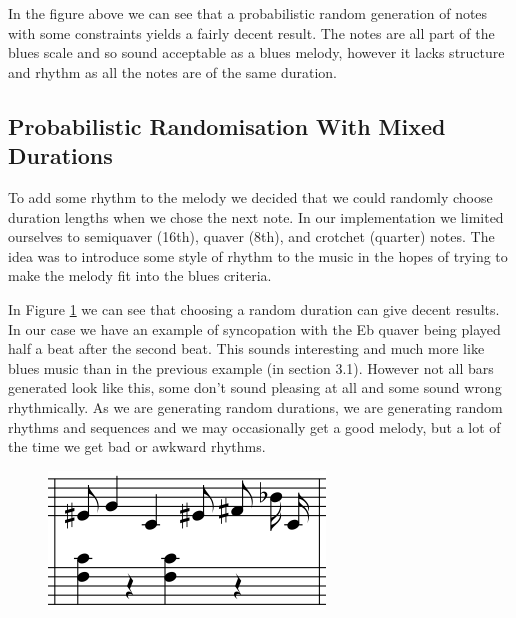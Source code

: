 \documentclass[pdftex,12pt,a4paper]{report}
\begin{document}
In the figure above we can see that a probabilistic random generation of notes with some constraints yields a fairly decent result. The notes are all part of the blues scale and so sound acceptable as a blues melody, however it lacks structure and rhythm as all the notes are of the same duration. 

\subsection{Probabilistic Randomisation With Mixed Durations}

To add some rhythm to the melody we decided that we could randomly choose duration lengths when we chose the next note. In our implementation we limited ourselves to semiquaver (16th), quaver (8th), and crotchet (quarter) notes. The idea was to introduce some style of rhythm to the music in the hopes of trying to make the melody fit into the blues criteria.

In Figure \ref{fig:randomgenerationwithdifferentdurations} we can see that choosing a random duration can give decent results. In our case we have an example of syncopation with the Eb quaver being played half a beat after the second beat. This sounds interesting and much more like blues music than in the previous example (in section 3.1). However not all bars generated look like this, some don't sound pleasing at all and some sound wrong rhythmically. As we are generating random durations, we are generating random rhythms and sequences and we may occasionally get a good melody, but a lot of the time we get bad or awkward rhythms. 

\begin{figure}[here]
  \centering
  \includegraphics[scale=0.6]{figure/randomgenerationdifferentdurations.png}
  \label{fig:randomgenerationwithdifferentdurations}
\end{figure}
\end{document}
